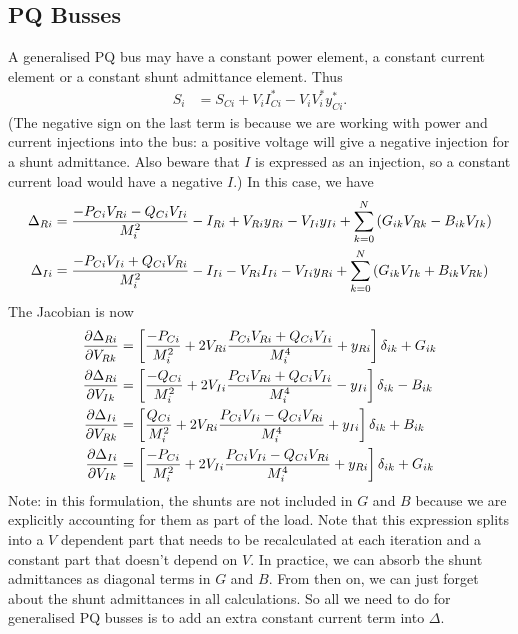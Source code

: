 \documentclass[11pt]{article}
\begin{document}
\subsection{PQ Busses}
A generalised PQ bus may have a constant power element, a constant current element or a constant shunt admittance element. Thus
\begin{align}
S_i &= S_{Ci} + V_iI^*_{Ci} - V_iV^*_iy^*_{Ci}.
\end{align}
(The negative sign on the last term is because we are working with power and current injections into the bus: a positive voltage will give a negative injection for a shunt admittance. Also beware that $I$ is expressed as an injection, so a constant current load would have a negative $I$.)
In this case, we have
\begin{align}
\Delta_{Ri} &= \frac{-P_{Ci}V_{Ri}-Q_{Ci}V_{Ii}}{M^2_i} - I_{Ri} + V_{Ri}y_{Ri} - V_{Ii}y_{Ii} + \sum_{k=0}^N\left(G_{ik}V_{Rk} - B_{ik}V_{Ik}\right)\notag \\
\Delta_{Ii} &= \frac{-P_{Ci}V_{Ii}+Q_{Ci}V_{Ri}}{M^2_i} - I_{Ii} -V_{Ri}I_{Ii} - V_{Ii}y_{Ri} + \sum_{k=0}^N\left(G_{ik}V_{Ik} + B_{ik}V_{Rk}\right)
\end{align}
The Jacobian is now
\begin{align}
\frac{\partial \Delta_{Ri}}{\partial V_{Rk}} &= \left[\frac{-P_{Ci}}{M^2_i} + 2V_{Ri}\frac{P_{Ci}V_{Ri} + Q_{Ci}V_{Ii}}{M^4_i} + y_{Ri}\right]\delta_{ik}+G_{ik} \notag \\
\frac{\partial \Delta_{Ri}}{\partial V_{Ik}} &= \left[\frac{-Q_{Ci}}{M^2_i} + 2V_{Ii}\frac{P_{Ci}V_{Ri} + Q_{Ci}V_{Ii}}{M^4_i} - y_{Ii}\right]\delta_{ik}-B_{ik} \notag \\
\frac{\partial \Delta_{Ii}}{\partial V_{Rk}} &= \left[\frac{Q_{Ci}}{M^2_i} + 2V_{Ri}\frac{P_{Ci}V_{Ii} - Q_{Ci}V_{Ri}}{M^4_i} + y_{Ii}\right]\delta_{ik}+B_{ik} \notag \\
\frac{\partial \Delta_{Ii}}{\partial V_{Ik}} &= \left[\frac{-P_{Ci}}{M^2_i} + 2V_{Ii}\frac{P_{Ci}V_{Ii} - Q_{Ci}V_{Ri}}{M^4_i} + y_{Ri}\right]\delta_{ik}+G_{ik}
\end{align}
Note: in this formulation, the shunts are not included in $G$ and $B$ because we are explicitly accounting for them as part of the load. Note that this expression splits into a $V$ dependent part that needs to be recalculated at each iteration and a constant part that doesn't depend on $V$. In practice, we can absorb the shunt admittances as diagonal terms in $G$ and $B$. From then on, we can just forget about the shunt admittances in all calculations. So all we need to do for generalised PQ busses is to add an extra constant current term into $\Delta$.
\end{document}
